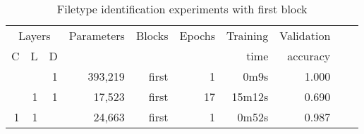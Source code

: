 \begin{table}[!ht]
    \centering
    \caption{Filetype identification experiments with first block}
    \label{tab:carving7-11}
\begin{tabular}{|r|r|r|r|r|r|r|r|r|r|}
\hline
\multicolumn{3}{|c|}{Layers} & Parameters & Blocks & Epochs & Training   & Validation \\ \cline{1-3}
C        & L       & D       &            &       &        & time       & accuracy   \\ \hline
         &         & 1       & 393,219    & first & 1      & 0m9s       & 1.000 \\ \hline
         & 1       & 1       & 17,523     & first & 17     & 15m12s     & 0.690 \\ \hline
1        & 1       &         & 24,663     & first & 1      & 0m52s      & 0.987 \\ \hline
\end{tabular}
\end{table}